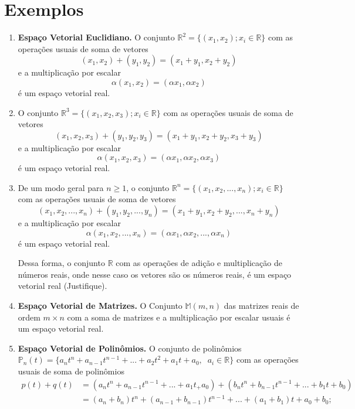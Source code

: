 \section{Exemplos}
\begin{enumerate}

\item \textbf{Espaço Vetorial Euclidiano.} O conjunto $\mathbb{R}^2=\{(x_1, x_2); x_i \in \mathbb{R}\}$ com as operações usuais de  soma de vetores $$(x_1, x_2)+(y_1, y_2)=(x_1+y_1, x_2+y_2)$$ e a multiplicação por escalar $$\alpha  (x_1, x_2)=(\alpha x_1, \alpha x_2)$$
é um espaço vetorial real.



\item O conjunto $\mathbb{R}^3=\{(x_1, x_2, x_3); x_i \in \mathbb{R}\}$ com as operações usuais de  soma de vetores $$(x_1, x_2, x_3)+(y_1, y_2, y_3)=(x_1+y_1, x_2+y_2, x_3+y_3)$$ e a multiplicação por escalar $$\alpha  (x_1, x_2, x_3)=(\alpha x_1, \alpha x_2, \alpha x_3)$$
é um espaço vetorial real.

\item De um modo geral para $n \geq 1$,  o conjunto $\mathbb{R}^n=\{(x_1, x_2,...,  x_n); x_i \in \mathbb{R}\}$ com as operações usuais de  soma de vetores $$(x_1, x_2,..., x_n)+(y_1, y_2,...,  y_n)=(x_1+y_1, x_2+y_2,..., x_n+y_n)$$ e a multiplicação por escalar $$\alpha  (x_1, x_2,..., x_n)=(\alpha x_1, \alpha x_2,..., \alpha x_n)$$
é um espaço vetorial real.

Dessa forma,  o  conjunto $\mathbb{R}$ com as operações de adição e multiplicação de números reais, onde nesse caso os vetores  são os números reais, é um espaço vetorial real  (Justifique).

\item \textbf{Espaço Vetorial de Matrizes.} O Conjunto $\mathbb{M}(m,n)$ das matrizes reais de ordem $m \times n$ com a soma  de matrizes e a multiplicação por escalar usuais  é um espaço vetorial real.

\item \textbf{Espaço Vetorial de Polinômios.} O conjunto de polinômios  $\mathbb{P}_n(t)=\{a_nt^n+a_{n-1}t^{n-1}+...+a_2t^2+a_1t+a_0,  \; \; a_i \in \mathbb{R}\}$    com as operações usuais de soma de polinômios
\begin{align*}
p(t)+q(t)&=(a_nt^n+ a_{n-1}t^{n-1}+...+a_1t_+a_0)+(b_nt^n+ b_{n-1}t^{n-1}+...+b_1t + b_0)\\
               &=(a_n+b_n)t^n+(a_{n-1}+b_{n-1})t^{n-1}+...+(a_1+b_1)t+a_0+b_0;
\end{align*}


\end{enumerate}
